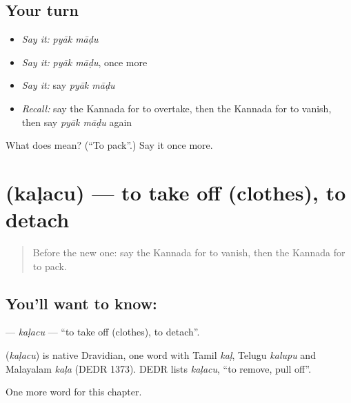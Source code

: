 \subsection*{Your turn}
\begin{itemize}
\raggedright
  \item \emph{Say it:} \emph{pyāk māḍu}
  \item \emph{Say it:} \emph{pyāk māḍu}, once more
  \item \emph{Say it:} say \emph{pyāk māḍu}
  \item \emph{Recall:} say the Kannada for to overtake, then the Kannada for to vanish, then say \emph{pyāk māḍu} again
\end{itemize}

\begin{tcolorbox}[breakable,colback=teal!4,colframe=teal!35!black,title={Before you move on}]
What does   mean? (\textquotedblleft{}To pack\textquotedblright{}.) Say it once more.
\end{tcolorbox}
\section[\texorpdfstring{\kn{ಕಳಚು} (kaḷacu)}{ಕಳಚು (kaḷacu)}]{ (kaḷacu) — to take off (clothes), to detach}

\label{lesson:KA-C281-kalacu}



\begin{quote}
Before the new one: say the Kannada for to vanish, then the Kannada for to pack.
\end{quote}

\subsection*{You'll want to know: }
\textbf{} — \emph{kaḷacu} — \textquotedblleft{}to take off (clothes), to detach\textquotedblright{}.

\begin{cousinweb}
\textbf{} (\emph{kaḷacu}) is native Dravidian, one word with Tamil \emph{kaḷ}, Telugu \emph{kalupu} and Malayalam \emph{kaḷa} (DEDR 1373). DEDR lists \emph{kaḷacu}, \textquotedblleft{}to remove, pull off\textquotedblright{}.
\end{cousinweb}

\begin{grammarlens}[title={What you've built}]
One more word for this chapter.
\end{grammarlens}

